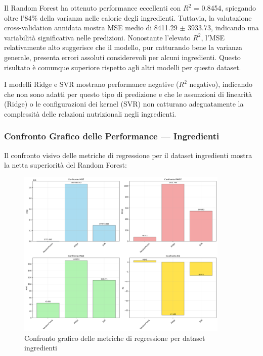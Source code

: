 \documentclass[12pt,a4paper]{article}
\begin{document}
Il Random Forest ha ottenuto performance eccellenti con $R^2$ = 0.8454, spiegando oltre l'84\% della varianza nelle calorie degli ingredienti. Tuttavia, la valutazione cross-validation annidata mostra MSE medio di 8411.29 $\pm$ 3933.73, indicando una variabilità significativa nelle predizioni. Nonostante l'elevato $R^2$, l'MSE relativamente alto suggerisce che il modello, pur catturando bene la varianza generale, presenta errori assoluti considerevoli per alcuni ingredienti. Questo risultato è comunque superiore rispetto agli altri modelli per questo dataset.

I modelli Ridge e SVR mostrano performance negative ($R^2$ negativo), indicando che non sono adatti per questo tipo di predizione e che le assunzioni di linearità (Ridge) o le configurazioni dei kernel (SVR) non catturano adeguatamente la complessità delle relazioni nutrizionali negli ingredienti.

\subsubsection{Confronto Grafico delle Performance --- Ingredienti}

Il confronto visivo delle metriche di regressione per il dataset ingredienti mostra la netta superiorità del Random Forest:

\begin{figure}[H]
\centering
\includegraphics[width=0.9\textwidth]{dati/regression_metrics_comparison.png}
\caption{Confronto grafico delle metriche di regressione per dataset ingredienti}
\label{fig:regression_metrics_comparison_ingredienti}
\end{figure}
\end{document}
